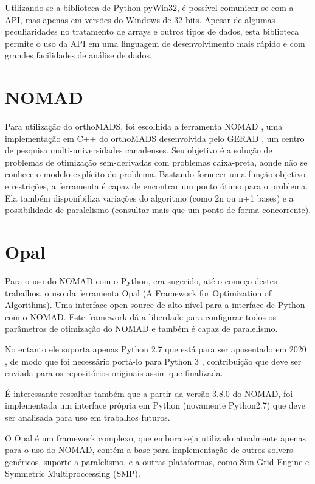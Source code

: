  Utilizando-se a biblioteca de Python pyWin32, é possível comunicar-se com a API, mas apenas em versões do Windows de 32 bits. Apesar de algumas peculiaridades no tratamento de arrays e outros tipos de dados, esta biblioteca permite o uso da API em uma linguagem de desenvolvimento mais rápido\cite{pythonfast} e com grandes facilidades de análise de dados.

\section{NOMAD}
Para utilização do orthoMADS, foi escolhida a ferramenta NOMAD \cite{Nomad}, uma implementação em C++ do orthoMADS desenvolvida pelo GERAD \cite{gerad}, um centro de pesquisa multi-universidades canadenses.
%
Seu objetivo é a solução de problemas de otimização sem-derivadas com problemas caixa-preta, aonde não se conhece o modelo explícito do problema.
%
Bastando fornecer uma função objetivo e restrições, a ferramenta é capaz de encontrar um ponto ótimo para o problema.
Ela também disponibiliza variações do algoritmo (como 2n ou n+1 bases) e a possibilidade de paralelismo (consultar mais que um ponto de forma concorrente).  

	

\section{Opal}
Para o uso do NOMAD com o Python, era sugerido, até o começo destes trabalhos, o uso da ferramenta Opal \cite{opal} (A Framework for Optimization of Algorithms). Uma interface open-source de alto nível para a interface de Python com o NOMAD. Este framework dá a liberdade para configurar todos os parâmetros de otimização do NOMAD e também é capaz de paralelismo.

No entanto ele suporta apenas Python 2.7 que está para ser aposentado em 2020 \cite{python27sched}, de modo que foi necessário portá-lo para Python 3 \cite{opalPython3}, contribuição que deve ser enviada para os repositórios originais assim que finalizada.

É interessante ressaltar também que a partir da versão 3.8.0 do NOMAD, foi implementada um interface própria em Python (novamente Python2.7) que deve ser analisada para uso em trabalhos futuros.

O Opal é um framework complexo, que embora seja utilizado atualmente apenas para o uso do NOMAD, contém a base para implementação de outros solvers genéricos, suporte a paralelismo, e a outras plataformas, como Sun Grid Engine e Symmetric Multiproccessing (SMP).


